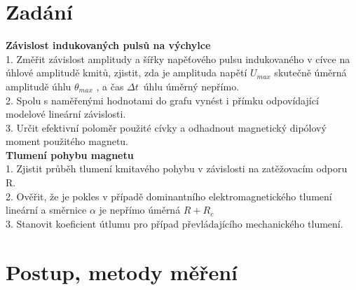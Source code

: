 \documentclass[czech,11pt,a4paper]{article}
\begin{document}
	\section{Zadání}
	\textbf{Závislost indukovaných pulsů na výchylce}	\\
	1. Změřit závislost amplitudy a šířky napěťového pulsu indukovaného v cívce na úhlové amplitudě kmitů, zjistit, zda je amplituda napětí $U_{max}$ skutečně úměrná amplitudě úhlu $\theta_{max}$ , a čas $\Delta t$\ úhlu úměrný nepřímo.\\
	2. Spolu s naměřenými hodnotami do grafu vynést i přímku odpovídající modelové lineární závislosti.\\
	3. Určit efektivní poloměr použité cívky a odhadnout magnetický dipólový moment použitého magnetu.\\
	\textbf{Tlumení pohybu magnetu}\\
	1. Zjistit průběh tlumení kmitavého pohybu v závislosti na zatěžovacím odporu R.\\
	2. Ověřit, že je pokles v případě dominantního elektromagnetického tlumení lineární a směrnice $\alpha$ je nepřímo úměrná $R+R_c$\\
	3. Stanovit koeficient útlumu pro případ převládajícího mechanického tlumení.\\
	
	\section{Postup, metody měření}
\end{document}

